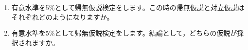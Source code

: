\begin{enumerate}
	\item 有意水準を5\%として帰無仮説検定をします。この時の帰無仮説と対立仮説はそれぞれどのようになりますか。
	\item 有意水準を5\%として帰無仮説検定をします。結論として，どちらの仮説が採択されますか。
\end{enumerate}
